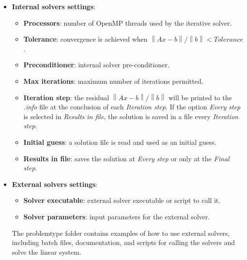 \begin{itemize}
    After the matrix and vector are saved, the external solver will be called using the parameters specified in \emph{External solvers settings}. Once the external solver completes its execution, ERMES 20.0 will be called again to read the solution and generate result files suitable for visualization. If the textboxes in \emph{External solvers settings} are left blank, ERMES 20.0 will end immediately after saving the linear system. The saved system can then be read and solved at a later time. Any previous solution file  is deleted before the external solver is called, and ERMES stops with an error message if the external solver does not write a complete solution.
    
    ERMES returns a non-zero exit status when it stops because of an error, and writes its error messages in the file . Batch scripts can use the exit status to detect failed runs (e.g., SLURM ). 
	\item \textbf{Internal solvers settings}: 
	\begin{itemize}\itemsep0.5em 
		\item \textbf{Processors}: number of OpenMP threads used by the iterative solver.
		\item \textbf{Tolerance}: convergence is achieved when $\left\| Ax - b \right\| / \left\| b \right\| < Tolerance$.
		\item \textbf{Preconditioner}: internal solver pre-conditioner.
		\item \textbf{Max iterations}: maximum number of iterations permitted.
		\item \textbf{Iteration step}: the residual $\left\| Ax - b \right\| / \left\| b \right\|$ will be printed to the \textit{.info} file at the conclusion of each \emph{Iteration step}. If the option \textit{Every step} is selected in \emph{Results in file}, the solution is saved in a file every \emph{Iteration step}.
		\item \textbf{Initial guess}: a solution file is read and used as an initial guess.
		\item \textbf{Results in file}: saves the solution at \textit{Every step} or only at the \textit{Final step}.
	\end{itemize}
	\item \textbf{External solvers settings}: 
	\begin{itemize}\itemsep0.25em 
		\item \textbf{Solver executable}: external solver executable or script to call it. 
		\item \textbf{Solver parameters}: input parameters for the external solver.
	\end{itemize}
	The problemtype folder  contains examples of how to use external solvers, including batch files, documentation, and scripts for calling the solvers and solve the linear system.
\end{itemize}

